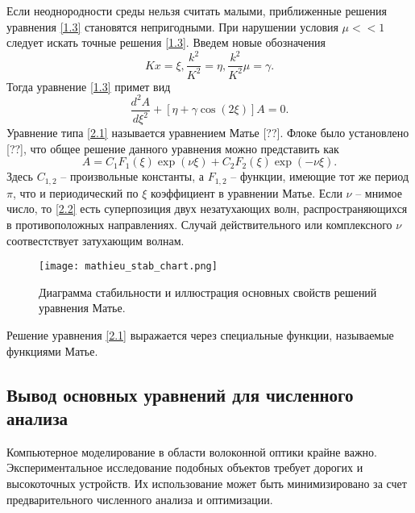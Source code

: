 Если неоднородности среды нельзя считать малыми, приближенные решения уравнения \eqref{1.3} становятся непригодными. При нарушении условия $\mu << 1$ следует искать точные решения \eqref{1.3}. Введем новые обозначения
$$
Kx=\xi, \frac{k^2}{K^2}=\eta, \frac{k^2}{K^2}\mu=\gamma.
$$
Тогда уравнение \eqref{1.3} примет вид
\begin{equation}\label{2.1}
\frac{d^2A}{d\xi^2}+[\eta+\gamma\cos(2\xi)]A=0.
\end{equation}
Уравнение типа \eqref{2.1} называется уравнением Матье [??]. Флоке было установлено [??], что общее решение данного уравнения можно представить как
\begin{equation}\label{2.2}
A=C_1F_1(\xi)\exp(\nu\xi)+C_2F_2(\xi)\exp(-\nu\xi).
\end{equation}
Здесь $C_{1, 2}$ -- произвольные константы, а $F_{1, 2}$ -- функции, имеющие тот же период $\pi$, что и периодический по $\xi$ коэффициент в уравнении Матье. Если $\nu$ -- мнимое число, то \eqref{2.2} есть суперпозиция двух незатухающих волн, распространяющихся в противоположных направлениях. Случай действительного или комплексного $\nu$ соотвестствует затухающим волнам.
\begin{figure}
  \centering
    \texttt{[image: mathieu\_stab\_chart.png]}
    \caption{Диаграмма стабильности и иллюстрация основных свойств решений уравнения Матье.}
    \label{img:mathieu_stab_chart}
\end{figure}
Решение уравнения \eqref{2.1} выражается через специальные функции, называемые функциями Матье.



\subsection{Вывод основных уравнений для численного анализа}
\label{sec:ricatti}

Компьютерное моделирование в области волоконной оптики крайне важно. Экспериментальное исследование подобных объектов требует дорогих и высокоточных устройств. Их использование может быть минимизировано за счет предварительного численного анализа и оптимизации.

